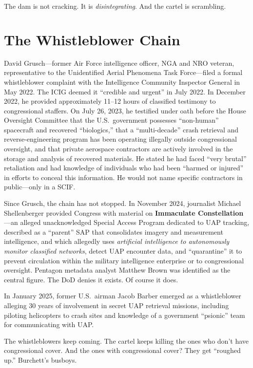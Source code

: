 \documentclass[11pt,a4paper]{article}
\begin{document}
The dam is not cracking. It is \textit{disintegrating}. And the cartel is scrambling.

\section{The Whistleblower Chain}

David Grusch---former Air Force intelligence officer, NGA and NRO veteran, representative to the Unidentified Aerial Phenomena Task Force---filed a formal whistleblower complaint with the Intelligence Community Inspector General in May 2022. The ICIG deemed it ``credible and urgent'' in July 2022. In December 2022, he provided approximately 11--12 hours of classified testimony to congressional staffers. On July 26, 2023, he testified under oath before the House Oversight Committee that the U.S.\ government possesses ``non-human'' spacecraft and recovered ``biologics,'' that a ``multi-decade'' crash retrieval and reverse-engineering program has been operating illegally outside congressional oversight, and that private aerospace contractors are actively involved in the storage and analysis of recovered materials. He stated he had faced ``very brutal'' retaliation and had knowledge of individuals who had been ``harmed or injured'' in efforts to conceal this information. He would not name specific contractors in public---only in a SCIF.

Since Grusch, the chain has not stopped. In November 2024, journalist Michael Shellenberger provided Congress with material on \textbf{Immaculate Constellation}---an alleged unacknowledged Special Access Program dedicated to UAP tracking, described as a ``parent'' SAP that consolidates imagery and measurement intelligence, and which allegedly uses \textit{artificial intelligence to autonomously monitor classified networks}, detect UAP encounter data, and ``quarantine'' it to prevent circulation within the military intelligence enterprise or to congressional oversight. Pentagon metadata analyst Matthew Brown was identified as the central figure. The DoD denies it exists. Of course it does.

In January 2025, former U.S.\ airman Jacob Barber emerged as a whistleblower alleging 30 years of involvement in secret UAP retrieval missions, including piloting helicopters to crash sites and knowledge of a government ``psionic'' team for communicating with UAP.

The whistleblowers keep coming. The cartel keeps killing the ones who don't have congressional cover. And the ones with congressional cover? They get ``roughed up.'' Burchett's busboys.
\end{document}
